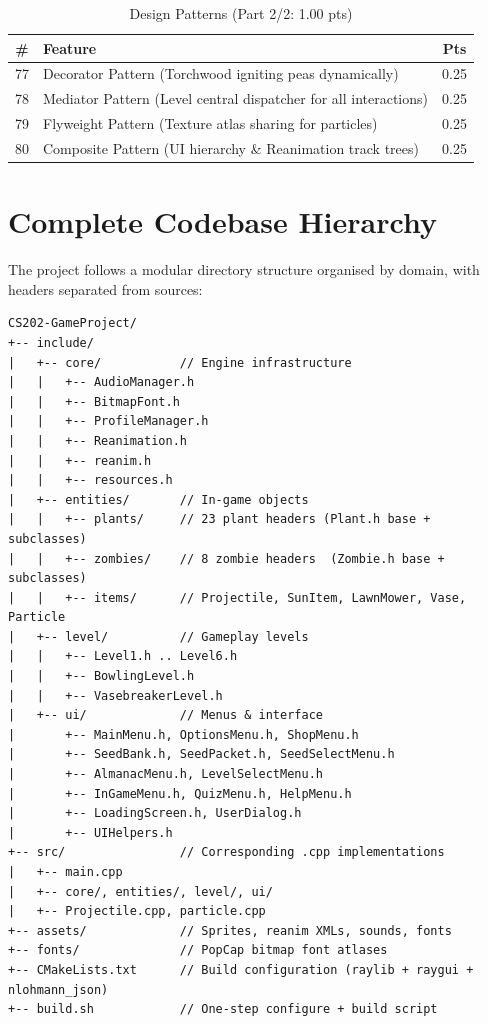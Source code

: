 \documentclass[12pt,a4paper]{article}
\begin{document}
\begin{table}[htbp]
\centering
\footnotesize
\begin{tabular}{clc}
\toprule
\textbf{\#} & \textbf{Feature} & \textbf{Pts} \\
\midrule
77 & Decorator Pattern (Torchwood igniting peas dynamically) & 0.25 \\
78 & Mediator Pattern (Level central dispatcher for all interactions) & 0.25 \\
79 & Flyweight Pattern (Texture atlas sharing for particles) & 0.25 \\
80 & Composite Pattern (UI hierarchy \& Reanimation track trees) & 0.25 \\
\bottomrule
\end{tabular}
\caption{Design Patterns (Part 2/2: 1.00 pts)}
\end{table}
\renewcommand{\arraystretch}{1.0}
\newpage

\section{Complete Codebase Hierarchy}
The project follows a modular directory structure organised by domain, with headers separated from sources:
\begin{verbatim}
CS202-GameProject/
+-- include/
|   +-- core/           // Engine infrastructure
|   |   +-- AudioManager.h
|   |   +-- BitmapFont.h
|   |   +-- ProfileManager.h
|   |   +-- Reanimation.h
|   |   +-- reanim.h
|   |   +-- resources.h
|   +-- entities/       // In-game objects
|   |   +-- plants/     // 23 plant headers (Plant.h base + subclasses)
|   |   +-- zombies/    // 8 zombie headers  (Zombie.h base + subclasses)
|   |   +-- items/      // Projectile, SunItem, LawnMower, Vase, Particle
|   +-- level/          // Gameplay levels
|   |   +-- Level1.h .. Level6.h
|   |   +-- BowlingLevel.h
|   |   +-- VasebreakerLevel.h
|   +-- ui/             // Menus & interface
|       +-- MainMenu.h, OptionsMenu.h, ShopMenu.h
|       +-- SeedBank.h, SeedPacket.h, SeedSelectMenu.h
|       +-- AlmanacMenu.h, LevelSelectMenu.h
|       +-- InGameMenu.h, QuizMenu.h, HelpMenu.h
|       +-- LoadingScreen.h, UserDialog.h
|       +-- UIHelpers.h
+-- src/                // Corresponding .cpp implementations
|   +-- main.cpp
|   +-- core/, entities/, level/, ui/
|   +-- Projectile.cpp, particle.cpp
+-- assets/             // Sprites, reanim XMLs, sounds, fonts
+-- fonts/              // PopCap bitmap font atlases
+-- CMakeLists.txt      // Build configuration (raylib + raygui + nlohmann_json)
+-- build.sh            // One-step configure + build script
\end{verbatim}
\end{document}
